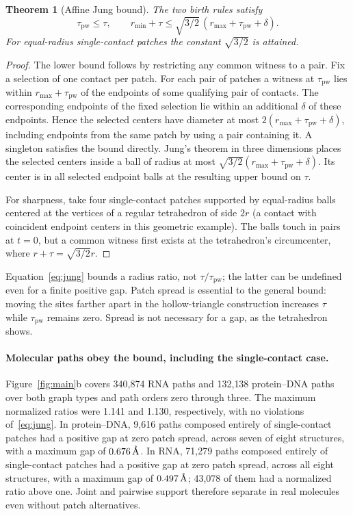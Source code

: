 \documentclass[11pt]{article}
\newcommand{\angstrom}{\ensuremath{\text{\normalfont\AA}}}
\newcommand{\pw}{\tau_{\mathrm{pw}}}
\newcommand{\Jung}{\sqrt{3/2}}
\newtheorem{theorem}{Theorem}
\begin{document}
\begin{theorem}[Affine Jung bound]
\label{thm:jung}
The two birth rules satisfy
\begin{equation}
 \pw\leq\tau,
 \qquad
 r_{\min}+\tau\leq \Jung\,(r_{\max}+\pw+\delta).
 \label{eq:jung}
\end{equation}
For equal-radius single-contact patches the constant $\Jung$ is attained.
\end{theorem}
\begin{proof}
The lower bound follows by restricting any common witness to a pair. Fix a selection of one contact per patch. For each pair of patches a witness at $\pw$ lies within $r_{\max}+\pw$ of the endpoints of some qualifying pair of contacts. The corresponding endpoints of the fixed selection lie within an additional $\delta$ of these endpoints. Hence the selected centers have diameter at most $2(r_{\max}+\pw+\delta)$, including endpoints from the same patch by using a pair containing it. A singleton satisfies the bound directly. Jung's theorem in three dimensions places the selected centers inside a ball of radius at most $\Jung(r_{\max}+\pw+\delta)$\citep{jung1901}. Its center is in all selected endpoint balls at the resulting upper bound on $\tau$.

For sharpness, take four single-contact patches supported by equal-radius balls centered at the vertices of a regular tetrahedron of side $2r$ (a contact with coincident endpoint centers in this geometric example). The balls touch in pairs at $t=0$, but a common witness first exists at the tetrahedron's circumcenter, where $r+\tau=\Jung r$.
\end{proof}

Equation~\eqref{eq:jung} bounds a radius ratio, not $\tau/\pw$; the latter can be undefined even for a finite positive gap. Patch spread is essential to the general bound: moving the sites farther apart in the hollow-triangle construction increases $\tau$ while $\pw$ remains zero. Spread is not necessary for a gap, as the tetrahedron shows.

\paragraph{Molecular paths obey the bound, including the single-contact case.}
Figure~\ref{fig:main}b covers 340{,}874 RNA paths and 132{,}138 protein--DNA paths over both graph types and path orders zero through three. The maximum normalized ratios were 1.141 and 1.130, respectively, with no violations of~\eqref{eq:jung}. In protein--DNA, 9{,}616 paths composed entirely of single-contact patches had a positive gap at zero patch spread, across seven of eight structures, with a maximum gap of $0.676\,\angstrom$. In RNA, 71{,}279 paths composed entirely of single-contact patches had a positive gap at zero patch spread, across all eight structures, with a maximum gap of $0.497\,\angstrom$; 43{,}078 of them had a normalized ratio above one. Joint and pairwise support therefore separate in real molecules even without patch alternatives.
\end{document}
